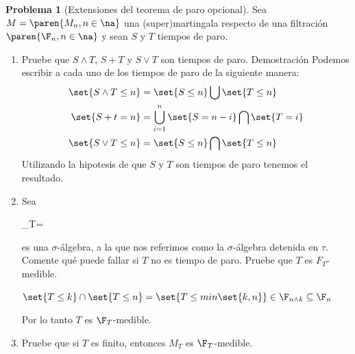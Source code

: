 \documentclass[a5paper,oneside]{amsart}
\theoremstyle{plain}
\theoremstyle{definition}
\newtheorem{problema}{Problema}
\begin{document}
\begin{problema}[Extensiones del teorema de paro opcional]
Sea \(M=\paren{M_n,n\in\na}\) una (super)martingala respecto de una filtraci\'on \(\paren{\F_n,n\in\na}\) y sean \(S\) y \(T\) tiempos de paro.
\begin{enumerate}
                \item Pruebe que \(S\wedge T\), \(S+T\) y \(S\vee T\) son tiempos de paro.
                Demostraci\'on
                Podemos escribir a cada uno de los tiempos de paro de la siguiente manera:
                \begin{align}
                \set{S\wedge T \leq n}&=\set{S\leq n}\bigcup \set{T\leq n} \notag \\
                \set{S+t= n}&=\bigcup_{i=1}^{n} \set{S= n-i}\bigcap \set{T= i} \notag \\
                \set{S\vee T \leq n}&=\set{S\leq n}\bigcap \set{T\leq n} \notag 
                \end{align}
                Utilizando la hipotesis de que $S$ y $T$ son tiempos de paro tenemos el resultado.
                \item Sea \begin{esn}\F_T=\end{esn}es una \(\sigma\)-\'algebra, a la que nos referimos como la \(\sigma\)-\'algebra detenida en \(\tau\). Comente qu\'e puede fallar si \(T\) no es tiempo de paro. Pruebe que \(T\) es \(F_T\)-medible.
                
                $\set{T\leq k}\cap\set{T\leq n}=\set{T\leq min\set{k,n}}	 \in \F_{n\wedge k}\subseteq \F_n$
                
                Por lo tanto $T$ es $\F_T$-medible.
                
                \item Pruebe que si \(T\) es finito, entonces \(M_T\) es \(\F_T\)-medible.
                
                
                

\end{enumerate}
\end{problema}
\end{document}
